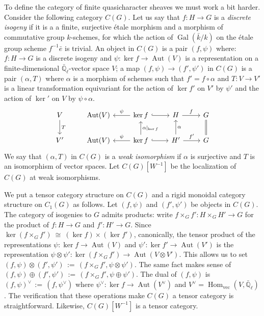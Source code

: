 \documentclass[11pt]{amsart}
\theoremstyle{plain}
\theoremstyle{definition}
\theoremstyle{remark}
\newcommand{\EE}{\mathbb{\bar Q}_\ell}
\newcommand{\bFq}{\bar{k}}
\newcommand{\Fq}{k}
\DeclareMathOperator{\Gal}{Gal}
\DeclareMathOperator{\Aut}{Aut}
\DeclareMathOperator{\Hom}{Hom}
\newcommand{\cdef}[1]{ {#1}\index{#1} }
\newcommand{\ceq}{{\, :=\, }}
\newcommand{\iso}{{\ \cong\ }}
\begin{document}
To define the category of finite quasicharacter sheaves we must work a bit harder.
Consider the following category $C(G)$.
Let us say that $f : H\to G$ is a \emph{discrete isogeny} if it is a a finite, surjective
\'etale morphism and a morphism of commutative group $\Fq$-schemes, for which
the action of $\Gal(\bFq/\Fq)$ on the \'etale group scheme $f^{-1}{\bar e}$ is trivial.
An object in $C(G)$ is a pair $(f,\psi)$ where: 
$f : H\to G$ is a discrete isogeny 
and $\psi : \ker f\to \Aut(V)$ is a representation on a finite-dimensional $\EE$-vector space $V$;
a map $(f,\psi) \to (f',\psi')$ in $C(G)$ is a pair $(\alpha,T)$ 
where $\alpha$ is a morphism of schemes such that $f' = f\circ \alpha$
and $T : V\to V'$ is a linear transformation equivariant 
for the action of $\ker f'$ on $V'$ by $\psi'$ 
and the action of $\ker '$ on $V$ by $\psi \circ \alpha$.
\[
\begin{tikzcd}
V \arrow{d}{T} & \Aut(V) & \arrow[swap]{l}{\psi} \ker f \arrow[hook]{r} & H \arrow{r}{f} & \arrow[equal]{d} G\\
V' & \Aut(V) & \arrow[swap]{l}{\psi} \arrow[swap]{u}{\alpha\vert_{\ker f}} \ker f \arrow[hook]{r} & \arrow[swap]{u}{\alpha} H' \arrow{r}{f'} & G
\end{tikzcd}
\]
We say that $(\alpha,T)$ in $C(G)$ is a \emph{weak isomorphism} if $\alpha$ is surjective
and $T$ is an isomorphism of vector spaces.
Let \cdef{$C(G)[W^{-1}]$} be the localization of $C(G)$ at weak isomorphisms.

We put a tensor category structure on $C(G)$ 
and a rigid monoidal category structure on $C_1(G)$ as follows.
Let $(f,\psi)$ and $(f',\psi')$ be objects in $C(G)$. 
The category of isogenies to $G$ admits products: 
write $f\times_G f' : H\times_G H' \to G$ for the product of $f : H\to G$ and $f' : H'\to G$. 
Since $\ker(f\times_G f') \iso (\ker f)\times (\ker f')$, canonically,
the tensor product of the representations $\psi : \ker f\to \Aut(V)$ and $\psi' : \ker f'\to \Aut(V')$ 
is the representation $\psi \otimes\psi' :  \ker(f\times_G f') \to \Aut(V\otimes V')$. 
This allows us to set $(f,\psi)\otimes(f',\psi') \ceq (f\times_G f' ,\psi\otimes\psi')$. 
The same fact makes sense of $(f,\psi)\oplus(f',\psi')\ceq (f\times_G f' ,\psi\oplus\psi')$. 
The dual of $(f,\psi)$ is $(f,\psi)^\vee \ceq (f,\psi^\vee)$ 
where $\psi^\vee : \ker f \to \Aut(V^\vee)$ and $V^\vee = \Hom_\text{vec}(V,\EE)$. 
The verification that these operations make $C(G)$ a tensor category is straightforward.
Likewise, $C(G)[W^{-1}]$ is a tensor category.
\end{document}

